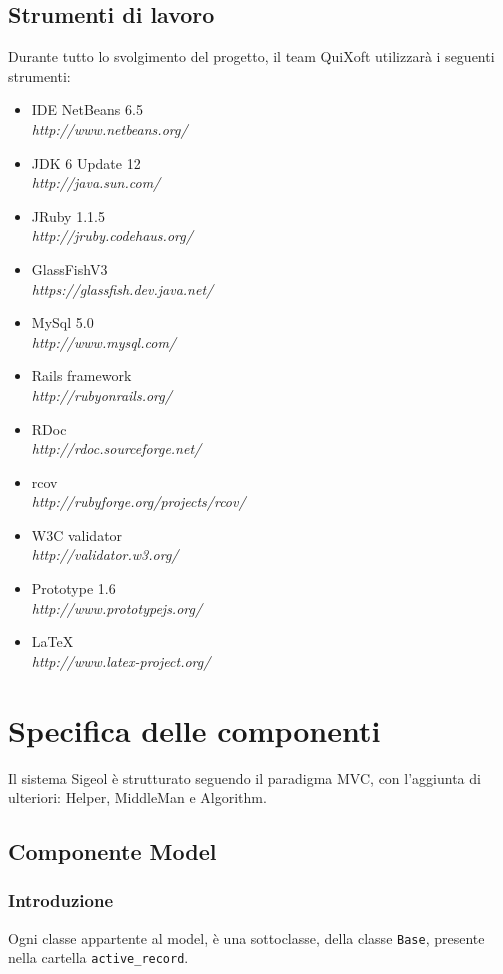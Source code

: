 \documentclass[11pt,a4paper]{article}
\begin{document}
\subsection{Strumenti di lavoro}
Durante tutto lo svolgimento del progetto, il team QuiXoft utilizzarà i seguenti strumenti:
\begin{itemize}
 \item IDE NetBeans 6.5 \\ \textit{http://www.netbeans.org/}
 \item JDK 6 Update 12 \\ \textit{http://java.sun.com/}
 \item JRuby 1.1.5 \\ \textit{http://jruby.codehaus.org/}
 \item GlassFishV3 \\ \textit{https://glassfish.dev.java.net/}
 \item MySql 5.0 \\ \textit{http://www.mysql.com/}
 \item Rails framework \\ \textit{http://rubyonrails.org/}
 \item RDoc \\ \textit{http://rdoc.sourceforge.net/}
 \item rcov \\ \textit{http://rubyforge.org/projects/rcov/}
 \item W3C validator \\ \textit {http://validator.w3.org/}
 \item Prototype 1.6 \\ \textit {http://www.prototypejs.org/}
 \item \LaTeX \\ \textit {http://www.latex-project.org/}
\end{itemize}

\section{Specifica delle componenti}
Il sistema Sigeol è strutturato seguendo il paradigma MVC, con l'aggiunta di ulteriori: Helper, MiddleMan e Algorithm.
\subsection{Componente Model}\label{model}
\subsubsection{Introduzione}
Ogni classe appartente al model, è una sottoclasse, della classe \verb|Base|, presente nella cartella \verb|active_record|.
\end{document}
